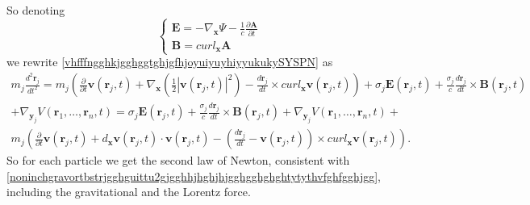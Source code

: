 \documentclass{article}
\theoremstyle{definition}
\theoremstyle{remark}
\renewcommand{\vec}[1]{\mathbf{#1}}
\newcommand{\er}{\eqref}
\newcommand{\er}{\eqref}
\begin{document}
So denoting
\begin{equation}\label{guigjgjffghguygjyfghgghjfgfSYSPN}
\begin{cases}
\vec E=-\nabla_{\vec x}\Psi-\frac{1}{c}\frac{\partial\vec
A}{\partial t}\\
\vec B=curl_{\vec x}\vec A
\end{cases}
\end{equation}
we rewrite \er{vhfffngghkjgghggtghjgfhjoyuiyuyhiyyukukySYSPN} as
\begin{multline}\label{vhfffngghkjgghggtghjgfhjoyuiyuyhiyyukukyihyuSYSPN}
m_j\frac{d^2\vec r_j}{dt^2}=m_j\left(\frac{\partial}{\partial t}\vec
v(\vec r_j,t)+\nabla_{\vec x}\left(\frac{1}{2}\left|\vec v(\vec
r_j,t)\right|^2\right)-\frac{d\vec r_j}{dt}\times curl_{\vec x}\vec
v(\vec r_j,t)\right)+\sigma_j\vec E(\vec
r_j,t)+\frac{\sigma_j}{c}\frac{d\vec r_j}{dt}\times \vec B(\vec
r_j,t)\\+\nabla_{\vec y_j}V\left(\vec r_1,\ldots,\vec
r_n,t\right)=\sigma_j\vec E(\vec
r_j,t)+\frac{\sigma_j}{c}\frac{d\vec r_j}{dt}\times \vec B(\vec
r_j,t)+\nabla_{\vec y_j}V\left(\vec r_1,\ldots,\vec r_n,t\right)+\\
m_j\left(\frac{\partial}{\partial t}\vec v(\vec r_j,t)+d_{\vec
x}\vec v(\vec r_j,t)\cdot\vec v(\vec r_j,t)-\left(\frac{d\vec
r_j}{dt}-\vec v(\vec r_j,t)\right)\times curl_{\vec x}\vec v(\vec
r_j,t)\right).
\end{multline}
So for each particle we get the second law of Newton, consistent
with
\er{noninchgravortbstrjgghguittu2gjgghhjhghjhjgghgghghghtytythvfghfgghjgg},
including the gravitational and the Lorentz force.
\end{document}

